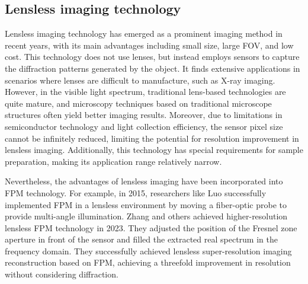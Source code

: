 \documentclass[journal,review,submit,pdftex,moreauthors]{Definitions/mdpi}
\begin{document}
\subsection{Lensless imaging technology }
Lensless imaging technology has emerged as a prominent imaging method in recent years, with its main advantages including small size, large FOV, and low cost. This technology does not use lenses, but instead employs sensors to capture the diffraction patterns generated by the object. It finds extensive applications in scenarios where lenses are difficult to manufacture, such as X-ray imaging. However, in the visible light spectrum, traditional lens-based technologies are quite mature, and microscopy techniques based on traditional microscope structures often yield better imaging results. Moreover, due to limitations in semiconductor technology and light collection efficiency, the sensor pixel size cannot be infinitely reduced, limiting the potential for resolution improvement in lensless imaging\cite{zhang2019lens}. Additionally, this technology has special requirements for sample preparation, making its application range relatively narrow.

Nevertheless, the advantages of lensless imaging have been incorporated into FPM technology. For example, in 2015, researchers like Luo successfully implemented FPM in a lensless environment by moving a fiber-optic probe to provide multi-angle illumination\cite{luo2015synthetic}. Zhang and others achieved higher-resolution lensless FPM technology in 2023\cite{zhang2023lensless}. They adjusted the position of the Fresnel zone aperture in front of the sensor and filled the extracted real spectrum in the frequency domain. They successfully achieved lensless super-resolution imaging reconstruction based on FPM, achieving a threefold improvement in resolution without considering diffraction.

\end{document}
